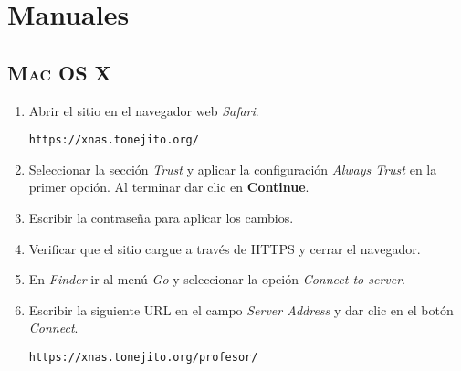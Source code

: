 {
  \linespread{1}
  \cleardoublepage  
  \appendix
  \chapter{Manuales}
  \label{apdx:a}
}


    \section {\textsc{Mac OS X}}

{
\linespread{0.1}
\begin{enumerate}

  \item Abrir el sitio en el navegador web \textsl{Safari}.

    \texttt{https://xnas.tonejito.org/}


  \item Seleccionar la secci\'{o}n \textit{Trust} y aplicar la configuraci\'{o}n \textsl{Always Trust} en la primer opci\'{o}n. Al terminar dar clic en \textbf{Continue}.


  \item Escribir la contrase\~{n}a para aplicar los cambios.


  \item Verificar que el sitio cargue a trav\'{e}s de \textsc{HTTPS} y cerrar el navegador.


  \item En \textsl{Finder} ir al men\'{u} \textsl{Go} y seleccionar la opci\'{o}n \textsl{Connect to server}.


  \item Escribir la siguiente \textsc{URL} en el campo \textsl{Server Address} y dar clic en el bot\'{o}n \textsl{Connect}.

    \texttt{https://xnas.tonejito.org/profesor/}


\end{enumerate}}
